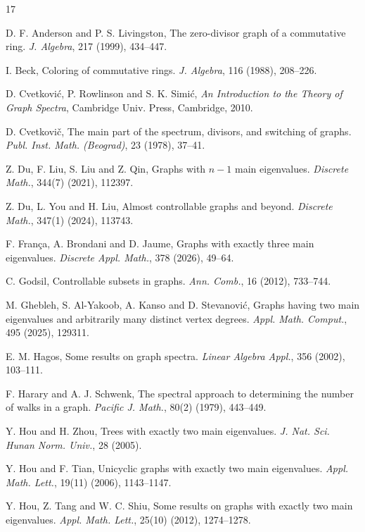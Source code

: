 \documentclass[11pt,oneside]{article}
\theoremstyle{plain}
\theoremstyle{plain}
\theoremstyle{definition}
\numberwithin{figure}{section}
\theoremstyle{remark}
\numberwithin{equation}{section}
\begin{document}
		
		\begin{thebibliography}{17}
			
			 D. F. Anderson and P. S. Livingston, The zero-divisor graph of a commutative ring. \textit{J. Algebra}, 217 (1999), 434--447.
			
			 I. Beck, Coloring of commutative rings. \textit{J. Algebra}, 116 (1988), 208--226.
			
			 D. Cvetkovi\'{c}, P. Rowlinson and S. K. Simi\'{c}, \textit{An Introduction to the Theory of Graph Spectra}, Cambridge Univ. Press, Cambridge, 2010.
			
			 D. Cvetkovi\v{c}, The main part of the spectrum, divisors, and switching of graphs. \textit{Publ. Inst. Math. (Beograd)}, 23 (1978), 37--41.
			
			 Z. Du, F. Liu, S. Liu and Z. Qin, Graphs with $n-1$ main eigenvalues. \textit{Discrete Math.}, 344(7) (2021), 112397.
			
			 Z. Du, L. You and H. Liu, Almost controllable graphs and beyond. \textit{Discrete Math.}, 347(1) (2024), 113743.
			
			 F. França, A. Brondani and D. Jaume, Graphs with exactly three main eigenvalues. \textit{Discrete Appl. Math.}, 378 (2026), 49--64.
			
			 C. Godsil, Controllable subsets in graphs. \textit{Ann. Comb.}, 16 (2012), 733--744.
			
			 M. Ghebleh, S. Al-Yakoob, A. Kanso and D. Stevanovi{\'c}, Graphs having two main eigenvalues and arbitrarily many distinct vertex degrees. \textit{Appl. Math. Comput.}, 495 (2025), 129311.
			
			
			 E. M. Hagos, Some results on graph spectra. \textit{Linear Algebra Appl.}, 356 (2002), 103--111.
			
			 F. Harary and A. J. Schwenk, The spectral approach to determining the number of walks in a graph. \textit{Pacific J. Math.}, 80(2) (1979), 443--449.
			
			 Y. Hou and H. Zhou, Trees with exactly two main eigenvalues. \textit{J. Nat. Sci. Hunan Norm. Univ.}, 28 (2005).
			
			 Y. Hou and F. Tian, Unicyclic graphs with exactly two main eigenvalues. \textit{Appl. Math. Lett.}, 19(11) (2006), 1143--1147.
			
			 Y. Hou, Z. Tang and W. C. Shiu, Some results on graphs with exactly two main eigenvalues. \textit{Appl. Math. Lett.}, 25(10) (2012), 1274--1278.
			

\end{thebibliography}
\end{document}
